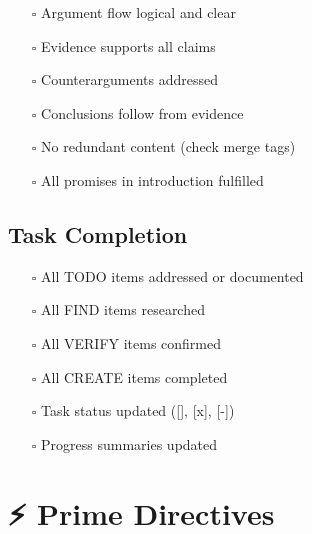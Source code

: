 \documentclass[
  11pt,
  letterpaper,
]{book}
\providecommand{\tightlist}{%
  \setlength{\itemsep}{0pt}\setlength{\parskip}{0pt}}
\begin{document}
\begin{itemize}
\tightlist
\item[$\square$]
  Argument flow logical and clear
\item[$\square$]
  Evidence supports all claims
\item[$\square$]
  Counterarguments addressed
\item[$\square$]
  Conclusions follow from evidence
\item[$\square$]
  No redundant content (check merge tags)
\item[$\square$]
  All promises in introduction fulfilled
\end{itemize}

\subsection*{Task Completion}\label{task-completion-1}

\begin{itemize}
\tightlist
\item[$\square$]
  All TODO items addressed or documented
\item[$\square$]
  All FIND items researched
\item[$\square$]
  All VERIFY items confirmed
\item[$\square$]
  All CREATE items completed
\item[$\square$]
  Task status updated ({[}{]}, {[}x{]}, {[}-{]})
\item[$\square$]
  Progress summaries updated
\end{itemize}

\section*{⚡ Prime Directives}\label{prime-directives}

\end{document}
